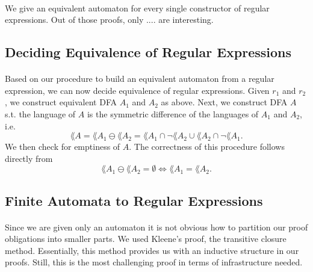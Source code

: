 \documentclass[11pt,a4paper,oneside]{book}
\begin{document}
                \paragraph{} 
                    We give an equivalent automaton for every single constructor of regular expressions.
                    Out of those proofs, only .... are interesting.

            \subsection{Deciding Equivalence of Regular Expressions}

                \paragraph{} 
                    Based on our procedure to build an equivalent automaton from a regular expression, we can now decide equivalence of regular expressions. Given $r_1$ and $r_2$, we construct equivalent DFA $A_1$ and $A_2$ as above.
                    Next, we construct DFA $A$ s.t. the language of $A$ is the symmetric difference of the languages of $A_1$ and $A_2$, i.e. 
                    \[ \lang{A} = \lang{A_1} \ominus \lang{A_2} = \lang{A_1} \cap \neg \lang{A_2} \cup \lang{A_2} \cap \neg \lang{A_1}.
                    \] 
                    We then check for emptiness of $A$. The correctness of this procedure follows directly from 
                    \[ 
                        \lang{A_1} \ominus \lang{A_2} = \emptyset \Leftrightarrow \lang{A_1} = \lang{A_2}.
                    \]
                    

            \subsection{Finite Automata to Regular Expressions}
                
                \paragraph{}
                Since we are given only an automaton it is not obvious how to partition our proof obligations into smaller parts.
                We used Kleene's proof, the transitive closure method. 
                Essentially, this method provides us with an inductive structure in our proofs. Still, this is the most challenging proof in terms of infrastructure needed.
\end{document}
